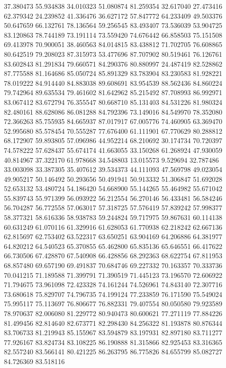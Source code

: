 37.380473
55.934838
34.010323
51.080874
81.259354
32.617040
27.473416
62.379342
24.239852
41.336476
36.627172
57.847772
64.233409
49.503376
50.647659
66.132761
78.136564
59.256545
83.493407
73.536039
53.904725
83.120863
78.744189
73.191114
73.559420
74.676442
66.858503
75.151508
69.413978
70.900051
38.460563
84.014815
83.438812
71.702705
76.608865
80.642519
79.208023
87.315973
53.477696
87.707902
80.519461
76.126761
83.602843
81.291834
79.660571
84.290376
80.880997
24.487419
82.528862
87.775588
81.164686
85.050724
85.891329
83.783904
83.230583
81.928221
78.019222
84.914440
84.883038
89.608691
83.954539
88.562436
84.860224
79.742964
89.635534
79.461602
81.642962
85.215492
87.708993
86.992971
83.067412
83.672794
76.355547
80.668710
85.131403
84.531226
81.980324
82.480161
88.628086
86.081288
84.792396
73.149016
84.549970
78.352080
72.366263
85.755935
84.665937
87.017917
67.005776
74.460905
63.369470
52.995680
85.578454
70.555287
77.676400
61.111901
67.770629
80.288812
68.172907
59.893805
57.096986
44.952214
68.210692
30.174734
70.720397
74.578222
57.628437
55.674174
41.663055
33.150268
61.268924
47.930059
40.814967
37.322170
61.978668
34.548803
13.015573
9.529694
32.787486
33.003098
33.387305
35.407612
39.534373
44.111093
47.569798
49.023054
49.905217
50.146492
50.293656
50.491941
50.913332
51.306847
51.692028
52.653132
53.480724
54.186420
54.668900
55.144265
55.464982
55.671042
55.839743
55.971399
56.093922
56.212554
56.270146
56.433481
56.584246
56.704287
56.772558
57.063017
57.318725
57.576419
57.839242
57.998377
58.377321
58.616336
58.938783
59.244824
59.717975
59.867631
60.114138
60.631249
61.070116
61.329916
61.628053
61.770938
62.218242
62.667136
62.815697
62.753402
63.522317
63.650251
63.904169
64.206886
64.381977
64.820212
64.540523
65.370855
65.462800
65.835136
65.646551
66.417622
66.730506
67.428870
67.540908
66.428856
68.292363
68.622754
67.811953
68.857480
69.657190
69.491837
70.684746
69.227332
70.163357
70.333736
70.041215
71.189588
71.399791
71.390519
71.445123
73.196570
72.606922
71.794675
73.961098
72.423328
74.161244
74.526961
74.843140
72.307716
73.680618
75.829707
74.796735
74.199124
77.233859
76.171590
75.549024
75.995117
75.113697
76.806677
76.882331
79.407554
80.050580
79.923589
78.970637
82.006080
81.229772
80.940473
80.600621
77.271119
77.884226
81.499456
82.814640
82.673771
82.298430
84.256322
81.193878
80.876344
83.706733
81.219943
85.155967
83.594879
83.197931
82.897180
83.711277
77.926167
83.824734
83.108225
86.190888
81.315866
82.925453
83.316365
82.557240
83.566141
80.421225
86.263795
86.775826
84.655799
85.082727
84.726369
83.518116
